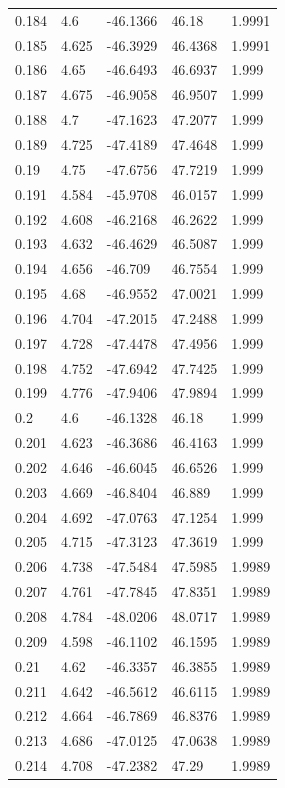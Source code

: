 \begin{tabular}{lllll}
0.184 & 4.6 & -46.1366 & 46.18 & 1.9991 \\
0.185 & 4.625 & -46.3929 & 46.4368 & 1.9991 \\
0.186 & 4.65 & -46.6493 & 46.6937 & 1.999 \\
0.187 & 4.675 & -46.9058 & 46.9507 & 1.999 \\
0.188 & 4.7 & -47.1623 & 47.2077 & 1.999 \\
0.189 & 4.725 & -47.4189 & 47.4648 & 1.999 \\
0.19 & 4.75 & -47.6756 & 47.7219 & 1.999 \\
0.191 & 4.584 & -45.9708 & 46.0157 & 1.999 \\
0.192 & 4.608 & -46.2168 & 46.2622 & 1.999 \\
0.193 & 4.632 & -46.4629 & 46.5087 & 1.999 \\
0.194 & 4.656 & -46.709 & 46.7554 & 1.999 \\
0.195 & 4.68 & -46.9552 & 47.0021 & 1.999 \\
0.196 & 4.704 & -47.2015 & 47.2488 & 1.999 \\
0.197 & 4.728 & -47.4478 & 47.4956 & 1.999 \\
0.198 & 4.752 & -47.6942 & 47.7425 & 1.999 \\
0.199 & 4.776 & -47.9406 & 47.9894 & 1.999 \\
0.2 & 4.6 & -46.1328 & 46.18 & 1.999 \\
0.201 & 4.623 & -46.3686 & 46.4163 & 1.999 \\
0.202 & 4.646 & -46.6045 & 46.6526 & 1.999 \\
0.203 & 4.669 & -46.8404 & 46.889 & 1.999 \\
0.204 & 4.692 & -47.0763 & 47.1254 & 1.999 \\
0.205 & 4.715 & -47.3123 & 47.3619 & 1.999 \\
0.206 & 4.738 & -47.5484 & 47.5985 & 1.9989 \\
0.207 & 4.761 & -47.7845 & 47.8351 & 1.9989 \\
0.208 & 4.784 & -48.0206 & 48.0717 & 1.9989 \\
0.209 & 4.598 & -46.1102 & 46.1595 & 1.9989 \\
0.21 & 4.62 & -46.3357 & 46.3855 & 1.9989 \\
0.211 & 4.642 & -46.5612 & 46.6115 & 1.9989 \\
0.212 & 4.664 & -46.7869 & 46.8376 & 1.9989 \\
0.213 & 4.686 & -47.0125 & 47.0638 & 1.9989 \\
0.214 & 4.708 & -47.2382 & 47.29 & 1.9989 \\

\end{tabular}
